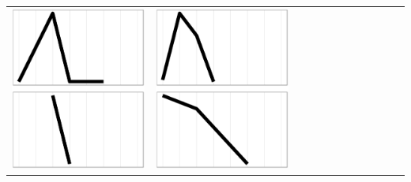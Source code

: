 \documentclass[conference]{worldcomp}
\begin{document}
\begin{table}
\begin{tabular}{ | b{1.5cm} | c | c | c | c | c | c | c | c | c | c | c |}
 \includegraphics[scale=0.08]{figures/bcbb.ps} &  
 \includegraphics[scale=0.08]{figures/ccaa.ps} &  

\end{tabular}
\end{table}
\end{document}
